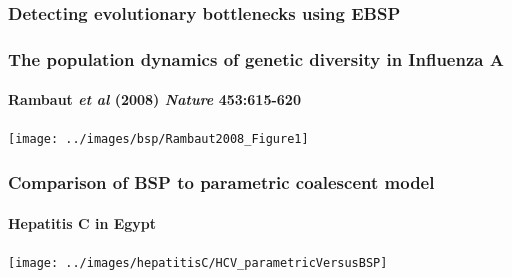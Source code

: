 \begin{frame}
\frametitle{Detecting evolutionary bottlenecks using EBSP}
\end{frame}

\begin{frame}
\frametitle{The population dynamics of genetic diversity in Influenza A}
\framesubtitle{Rambaut {\it et al} (2008) {\it Nature} {\bf 453}:615-620}
\begin{centering}%
\texttt{[image: ../images/bsp/Rambaut2008\_Figure1]}%
\par%
\end{centering}%
\end{frame}


\begin{frame}
\frametitle{Comparison of BSP to parametric coalescent model}
\framesubtitle{Hepatitis C in Egypt}
\begin{centering}%
\texttt{[image: ../images/hepatitisC/HCV\_parametricVersusBSP]}%
\par%
\end{centering}%
\end{frame}

